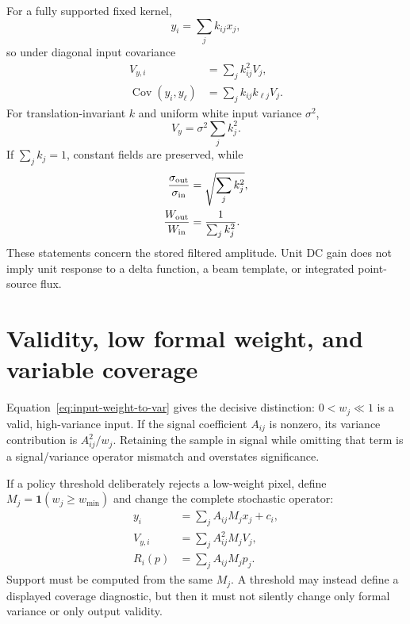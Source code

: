 \documentclass[11pt]{article}
\newcommand{\Cov}{\operatorname{Cov}}
\begin{document}
For a fully supported fixed kernel,
\begin{equation}
 y_i=\sum_jk_{ij}x_j,
 \label{eq:interior-signal}
\end{equation}
so under diagonal input covariance
\begin{align}
 V_{y,i}&=\sum_jk_{ij}^2V_j,
 \label{eq:interior-var}\\
 \Cov(y_i,y_\ell)&=\sum_jk_{ij}k_{\ell j}V_j.
 \label{eq:interior-cov}
\end{align}
For translation-invariant $k$ and uniform white input variance $\sigma^2$,
\begin{equation}
 V_y=\sigma^2\sum_jk_j^2.
 \label{eq:white-var}
\end{equation}
If $\sum_jk_j=1$, constant fields are preserved, while
\begin{align}
 {\sigma_{\rm out}\over\sigma_{\rm in}}&=
      \sqrt{\sum_jk_j^2},
 \label{eq:white-rms-ratio}\\
 {W_{\rm out}\over W_{\rm in}}&={1\over\sum_jk_j^2}.
 \label{eq:white-weight-ratio}
\end{align}
These statements concern the stored filtered amplitude.  Unit DC gain does
not imply unit response to a delta function, a beam template, or integrated
point-source flux.

\section{Validity, low formal weight, and variable coverage}
\label{sec:validity}

Equation~\eqref{eq:input-weight-to-var} gives the decisive distinction:
$0<w_j\ll1$ is a valid, high-variance input.  If the signal coefficient
$A_{ij}$ is nonzero, its variance contribution is $A_{ij}^2/w_j$.  Retaining
the sample in signal while omitting that term is a signal/variance operator
mismatch and overstates significance.

If a policy threshold deliberately rejects a low-weight pixel, define
$M_j=\mathbf1(w_j\geq w_{\min})$ and change the complete stochastic operator:
\begin{align}
 y_i&=\sum_jA_{ij}M_jx_j+c_i,
 \label{eq:thresholded-signal}\\
 V_{y,i}&=\sum_jA_{ij}^2M_jV_j,
 \label{eq:thresholded-var}\\
 R_i(p)&=\sum_jA_{ij}M_jp_j.
 \label{eq:thresholded-response}
\end{align}
Support must be computed from the same $M_j$.  A threshold may instead define
a displayed coverage diagnostic, but then it must not silently change only
formal variance or only output validity.
\end{document}
